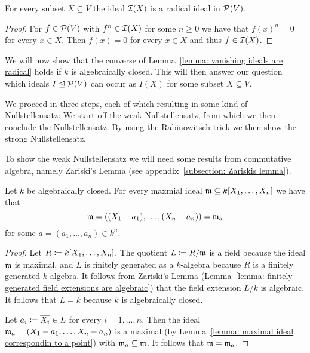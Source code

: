 \begin{lemma}
  \label{lemma: vanishing ideals are radical}
  For every subset $X \subseteq V$ the ideal $\mathcal{I}(X)$ is a radical ideal in $\mathcal{P}(V)$.
\end{lemma}


\begin{proof}
  For $f \in \mathcal{P}(V)$ with $f^n \in \mathcal{I}(X)$ for some $n \geq 0$ we have that $f(x)^n = 0$ for every $x \in X$.
  Then $f(x) = 0$ for every $x \in X$ and thus $f \in \mathcal{I}(X)$.
\end{proof}


\begin{fluff}
  We will now show that the converse of Lemma~\ref{lemma: vanishing ideals are radical} holds if $k$ is algebraically closed.
  This will then answer our question which ideals $I \trianglelefteq \mathcal{P}(V)$ can occur as $I(X)$ for some subset $X \subseteq V$.
  
  We proceed in three steps, each of which resulting in some kind of Nullstellensatz:
  We start off the weak Nullstellensatz, from which we then conclude the Nullstellensatz.
  By using the Rabinowitsch trick we then show the strong Nullstellensatz.
  
  To show the weak Nullstellensatz we will need some results from commutative algebra, namely Zariski’s Lemma (see appendix~\ref{subsection: Zariskis lemma}).
\end{fluff}


\begin{theorem}
  Let $k$ be algebraically closed.
  For every maxmial ideal \mbox{$\mathfrak{m} \subseteq k[X_1, \dotsc, X_n]$} we have that
  \[
      \mathfrak{m}
    = ( (X_1 - a_1), \dotsc, (X_n - a_n) )
    = \mathfrak{m}_a
  \]
  for some $a = (a_1, \dotsc, a_n) \in k^n$.
\end{theorem}


\begin{proof}
  Let $R \coloneqq k[X_1, \dotsc, X_n]$.
  The quotient $L \coloneqq R/\mathfrak{m}$ is a field because the ideal $\mathfrak{m}$ is maximal, and $L$ is finitely generated as a $k$-algebra because $R$ is a finitely generated $k$-algebra.
  It follows from Zariski’s Lemma (Lemma~\ref{lemma: finitely generated field extensions are algebraic}) that the field extension $L/k$ is algebraic.
  It follows that $L = k$ because $k$ is algebraically closed.
  
  Let $a_i \coloneqq \overline{X_i} \in L$ for every $i = 1, \dotsc, n$.
  Then the ideal $\mathfrak{m}_a = (X_1 - a_1, \dotsc, X_n - a_n)$ is a maximal (by Lemma~\ref{lemma: maximal ideal correspondin to a point}) with $\mathfrak{m}_a \subseteq \mathfrak{m}$.
  It follows that $\mathfrak{m} = \mathfrak{m}_a$.
\end{proof}


